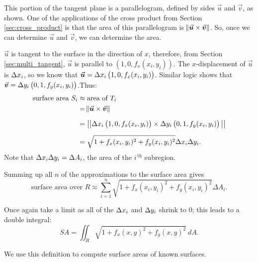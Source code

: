 This portion of the tangent plane is a parallelogram, defined by sides $\vec u$ and $\vec v$, as shown. One of the applications of the cross product from Section \ref{sec:cross_product} is that the area of this parallelogram is $\norm{\vec u\times \vec v}$. So, once we can determine $\vec u$ and $\vec v$, we can determine the area.

$\vec u$ is tangent to the surface in the direction of $x$, therefore, from Section \ref{sec:multi_tangent}, $\vec u$ is parallel to $\left( 1,0,f_x(x_i,y_i)\right)$. The $x$-displacement of $\vec u$ is $\Delta x_i$, so we know that $\vec u = \dx_i\left( 1,0,f_x(x_i,y_i)\right)$. Similar logic shows that $\vec v = \dy_i\left( 0,1,f_y(x_i,y_i)\right)$.Thus:
\begin{align*}
\text{surface area $S_i$} &\approx \text{area of  $T_i$}\\
				&= \norm{\vec u\times \vec v}\\[0.2cm]
				&= \big|\big|\dx_i\left( 1,0,f_x(x_i,y_i)\right)\times\dy_i\left( 0,1,f_y(x_i,y_i)\right)\big|\big|\\[0.2cm]
				&=\sqrt{1+f_x(x_i,y_i)^2+f_y(x_i,y_i)^2}\dx_i\dy_i.
\end{align*}
Note that $\Delta x_i\Delta y_i = \Delta A_i$, the area of the $i^{\,\text{th}}$ subregion.

Summing up all $n$ of the approximations to the surface area gives
$$\text{surface area over $R$} \approx \sum_{i=1}^n \sqrt{1+f_x(x_i,y_i)^2+f_y(x_i,y_i)^2}\Delta A_i.$$

Once again take a limit as all of the $\Delta x_i$ and $\Delta y_i$ shrink to 0; this leads to a double integral:
\begin{equation}
SA=\iint_R \sqrt{1+f_x(x,y)^2+f_y(x,y)^2}\ dA.
\label{def:surfacearea}
\end{equation}

We use this definition to compute surface areas of known surfaces. 

